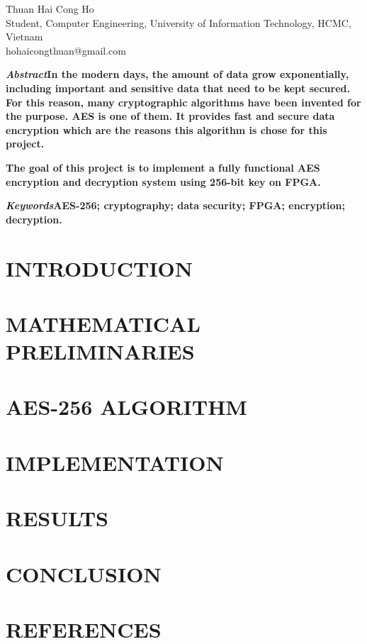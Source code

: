 \documentclass[a4paper, 10pt]{paper}
\begin{document}
    \title{}
    \author{}
    \maketitle %

    \begin{center}
        Thuan Hai Cong Ho\\
        Student, Computer Engineering, University of Information Technology, HCMC, Vietnam\\
        hohaicongthuan@gmail.com
    \end{center}

    \begin{multicols*}{2}

        \textbf{\textit{Abstract\textemdash}In the modern days, the amount of data grow exponentially, including important and sensitive data that need to be kept secured. For this reason, many cryptographic algorithms have been invented for the purpose. AES is one of them. It provides fast and secure data encryption which are the reasons this algorithm is chose for this project.}

        \textbf{The goal of this project is to implement a fully functional AES encryption and decryption system using 256-bit key on FPGA.}
        
        \bigskip

        \textbf{\textit{Keywords\textemdash}AES-256; cryptography; data security; FPGA; encryption; decryption.}

        \section{INTRODUCTION}

        \section{MATHEMATICAL PRELIMINARIES}

        \section{AES-256 ALGORITHM}

        \section{IMPLEMENTATION}

        \section{RESULTS}

        \section{CONCLUSION}

        \section*{REFERENCES}

    \end{multicols*}
\end{document}
